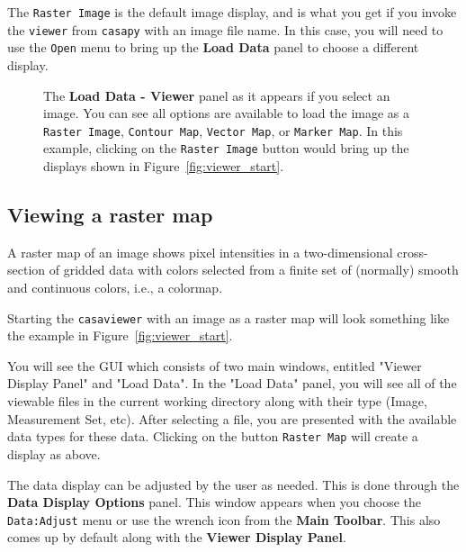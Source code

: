 The {\tt Raster Image} is the default image display, and is what you
get if you invoke the {\tt viewer} from {\tt casapy} with an image
file name.  In this case, you will need to use the {\tt Open} menu to
bring up the {\bf Load Data} panel to choose a different display.

\begin{figure}[h!]
\caption{\label{fig:viewer_load_image} The {\bf Load Data - Viewer} panel
as it appears if you select an image.  You can see all options
are available to load the image as a {\tt Raster Image}, 
{\tt Contour Map}, {\tt Vector Map}, or {\tt Marker Map}.
In this example, clicking on the {\tt Raster Image} button would 
bring up the displays shown in Figure~\ref{fig:viewer_start}.}
\hrulefill
\end{figure}


\subsection{Viewing a raster map}
\label{section:display.image.raster}

A raster map of an image shows pixel intensities in a two-dimensional
cross-section of gridded data with colors selected from a finite set
of (normally) smooth and continuous colors, i.e., a colormap.


Starting the {\tt casaviewer} with an image as a raster map will look
something like the example in Figure~\ref{fig:viewer_start}. 
 
You will see the GUI which consists of two main windows, entitled
"Viewer Display Panel" and "Load Data". In the "Load Data" panel, you
will see all of the viewable files in the current working directory along
with their type (Image, Measurement Set, etc).  After selecting a file, you
are presented with the available data types for these data. Clicking
on the button {\tt Raster Map} will create a display as above. 

The data display can be adjusted by the user as needed.  This
is done through the {\bf Data Display Options} panel.  This window
appears when you choose the {\tt Data:Adjust} menu or use the
wrench icon from the {\bf Main Toolbar}.  This also comes up
by default along with the {\bf Viewer Display Panel}.

